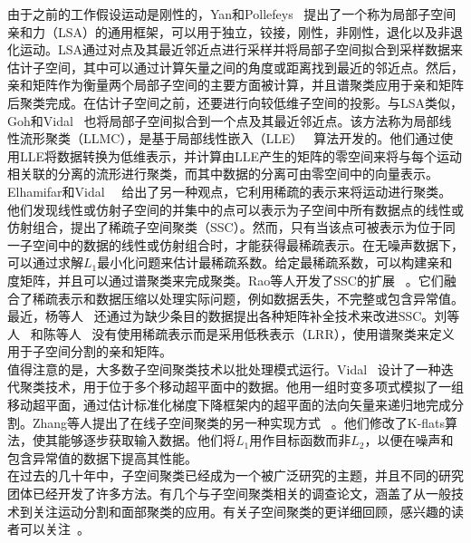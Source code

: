 由于之前的工作假设运动是刚性的，Yan和Pollefeys~\cite{yan2006general}
提出了一个称为局部子空间亲和力（LSA）的通用框架，可以用于独立，铰接，刚性，非刚性，退化以及非退化运动。LSA通过对点及其最近邻近点进行采样并将局部子空间拟合到采样数据来估计子空间，其中可以通过计算矢量之间的角度或距离找到最近的邻近点。然后，亲和矩阵作为衡量两个局部子空间的主要方面被计算，并且谱聚类应用于亲和矩阵后聚类完成。在估计子空间之前，还要进行向较低维子空间的投影。与LSA类似，Goh和Vidal~\cite{goh2007segmenting}
也将局部子空间拟合到一个点及其最近邻近点。该方法称为局部线性流形聚类（LLMC），是基于局部线性嵌入（LLE）~\cite{saul2003think}
算法开发的。他们通过使用LLE将数据转换为低维表示，并计算由LLE产生的矩阵的零空间来将与每个运动相关联的分离的流形进行聚类，而其中数据的分离可由零空间中的向量表示。\\

Elhamifar和Vidal~\cite{elhamifar2009sparse}~\cite{elhamifar2013sparse}
给出了另一种观点，它利用稀疏的表示来将运动进行聚类。他们发现线性或仿射子空间的并集中的点可以表示为子空间中所有数据点的线性或仿射组合，提出了稀疏子空间聚类（SSC）。然而，只有当该点可被表示为位于同一子空间中的数据的线性或仿射组合时，才能获得最稀疏表示。在无噪声数据下，可以通过求解$L_1$最小化问题来估计最稀疏系数。给定最稀疏系数，可以构建亲和度矩阵，并且可以通过谱聚类来完成聚类。Rao等人开发了SSC的扩展~\cite{rao2009motion}
。它们融合了稀疏表示和数据压缩以处理实际问题，例如数据丢失，不完整或包含异常值。最近，杨等人~\cite{yang2015sparse}
还通过为缺少条目的数据提出各种矩阵补全技术来改进SSC。刘等人~\cite{liu2012robust}
和陈等人~\cite{liu2010robust}
没有使用稀疏表示而是采用低秩表示（LRR），使用谱聚类来定义用于子空间分割的亲和矩阵。\\

值得注意的是，大多数子空间聚类技术以批处理模式运行。Vidal~\cite{vidal2007online}
设计了一种迭代聚类技术，用于位于多个移动超平面中的数据。他用一组时变多项式模拟了一组移动超平面，通过估计标准化梯度下降框架内的超平面的法向矢量来递归地完成分割。Zhang等人提出了在线子空间聚类的另一种实现方式~\cite{zhang2009median}
。他们修改了K-flats算法，使其能够逐步获取输入数据。他们将$L_1$用作目标函数而非$L_2$，以便在噪声和包含异常值的数据下提高其性能。\\

在过去的几十年中，子空间聚类已经成为一个被广泛研究的主题，并且不同的研究团体已经开发了许多方法。有几个与子空间聚类相关的调查论文，涵盖了从一般技术到关注运动分割和面部聚类的应用。有关子空间聚类的更详细回顾，感兴趣的读者可以关注~\cite{vidal2011subspace}。\\

